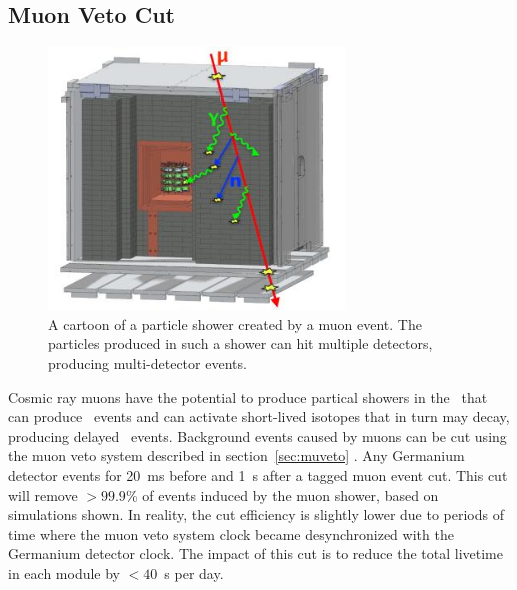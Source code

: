 \documentclass[/main.tex]{subfiles}
\begin{document}
\subsection{Muon Veto Cut}
\begin{figure}
  \centering
  \includegraphics[width=0.7\textwidth]{muonevent}
  \caption[Example muon event]{\label{fig:muonevent}
    A cartoon of a particle shower created by a muon event. The particles produced in such a shower can hit multiple detectors, producing multi-detector events.
  }
\end{figure}
Cosmic ray muons have the potential to produce partical showers in the \MJD\ that can produce \msmd\ events and can activate short-lived isotopes that in turn may decay, producing delayed \msmd\ events.
Background events caused by muons can be cut using the muon veto system described in section~\ref{sec:muveto} \cite{2015wiseman}.
Any Germanium detector events for 20~ms before and 1~s after a tagged muon event cut.
This cut will remove $>99.9$\% of events induced by the muon shower, based on simulations shown.
In reality, the cut efficiency is slightly lower due to periods of time where the muon veto system clock became desynchronized with the Germanium detector clock.
The impact of this cut is to reduce the total livetime in each module by $<40$~s per day.
\\
\end{document}

